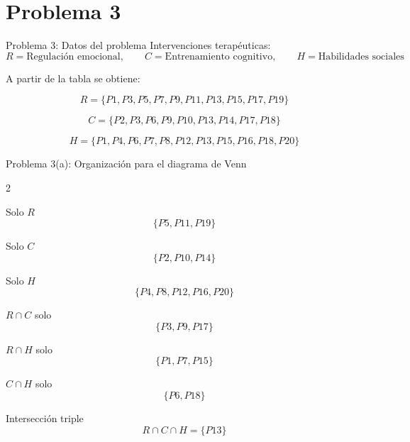 \documentclass[aspectratio=169,10pt]{beamer}
\begin{document}
	\section{Problema 3}
	
	\begin{frame}{Problema 3: Datos del problema}
		Intervenciones terapéuticas:
		\[
		R=\text{Regulación emocional},\qquad
		C=\text{Entrenamiento cognitivo},\qquad
		H=\text{Habilidades sociales}
		\]
		
		A partir de la tabla se obtiene:
		
		\[
		R=\{P1,P3,P5,P7,P9,P11,P13,P15,P17,P19\}
		\]
		
		\[
		C=\{P2,P3,P6,P9,P10,P13,P14,P17,P18\}
		\]
		
		\[
		H=\{P1,P4,P6,P7,P8,P12,P13,P15,P16,P18,P20\}
		\]
	\end{frame}
	
	\begin{frame}{Problema 3(a): Organización para el diagrama de Venn}
		\small
		\begin{multicols}{2}
			\begin{block}{Solo \(R\)}
				\[
				\{P5,P11,P19\}
				\]
			\end{block}
			
			\begin{block}{Solo \(C\)}
				\[
				\{P2,P10,P14\}
				\]
			\end{block}
			
			\begin{block}{Solo \(H\)}
				\[
				\{P4,P8,P12,P16,P20\}
				\]
			\end{block}
			
			\begin{block}{\(R\cap C\) solo}
				\[
				\{P3,P9,P17\}
				\]
			\end{block}
			
			\begin{block}{\(R\cap H\) solo}
				\[
				\{P1,P7,P15\}
				\]
			\end{block}
			
			\begin{block}{\(C\cap H\) solo}
				\[
				\{P6,P18\}
				\]
			\end{block}
			
			\begin{alertblock}{Intersección triple}
				\[
				R\cap C\cap H=\{P13\}
				\]
			\end{alertblock}
		\end{multicols}
		\normalsize
	\end{frame}
	
\end{document}
